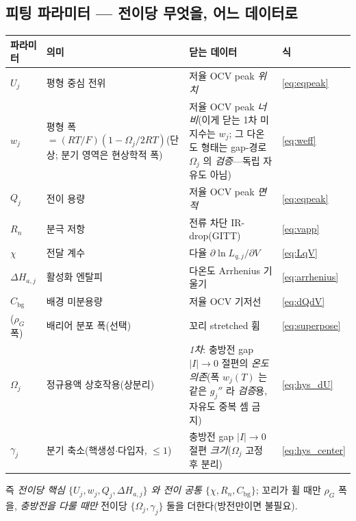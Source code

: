 \documentclass[11pt,a4paper]{article}
\newcommand{\bg}{\mathrm{bg}}
\begin{document}
\subsection{피팅 파라미터 — 전이당 무엇을, 어느 데이터로}
\begin{center}
\renewcommand{\arraystretch}{1.3}
\begin{tabular}{p{} p{} p{} p{}}
\toprule
파라미터 & 의미 & 닫는 데이터 & 식 \\
\midrule
$U_j$ & 평형 중심 전위 & 저율 OCV peak \emph{위치} & \eqref{eq:eqpeak} \\
$w_j$ & 평형 폭 $=(RT/F)(1-\Omega_j/2RT)$(단상; 분기 영역은 현상학적 폭) & 저율 OCV peak \emph{너비}(이게 닫는 1차 미지수는 $w_j$; 그 다온도 형태는 gap-경로 $\Omega_j$ 의 \emph{검증}—독립 자유도 아님) & \eqref{eq:weff} \\
$Q_j$ & 전이 용량 & 저율 OCV peak \emph{면적} & \eqref{eq:eqpeak} \\
$R_n$ & 분극 저항 & 전류 차단 IR-drop(GITT) & \eqref{eq:vapp} \\
$\chi$ & 전달 계수 & 다율 $\partial\ln L_{q,j}/\partial V$ & \eqref{eq:LqV} \\
$\Delta H_{a,j}$ & 활성화 엔탈피 & 다온도 Arrhenius 기울기 & \eqref{eq:arrhenius} \\
$C_\bg$ & 배경 미분용량 & 저율 OCV 기저선 & \eqref{eq:dQdV} \\
($\rho_G$ 폭) & 배리어 분포 폭(선택) & 꼬리 stretched 휨 & \eqref{eq:superpose} \\
$\Omega_j$ & 정규용액 상호작용(상분리) & \emph{1차}: 충방전 gap $|I|\!\to\!0$ 절편의 \emph{온도 의존}(폭 $w_j(T)$ 는 같은 $g_j''$ 라 \emph{검증}용, 자유도 중복 셈 금지) & \eqref{eq:hys_dU} \\
$\gamma_j$ & 분기 축소(핵생성$\cdot$다입자, $\le1$) & 충방전 gap $|I|\!\to\!0$ 절편 \emph{크기}($\Omega_j$ 고정 후 분리) & \eqref{eq:hys_center} \\
\bottomrule
\end{tabular}
\end{center}
즉 \emph{전이당 핵심 $\{U_j,w_j,Q_j,\Delta H_{a,j}\}$ 와 전이 공통 $\{\chi,R_n,C_\bg\}$}; 꼬리가 휠 때만 $\rho_G$ 폭을,
\emph{충방전을 다룰 때만} 전이당 $\{\Omega_j,\gamma_j\}$ 둘을 더한다(방전만이면 불필요).
\end{document}

